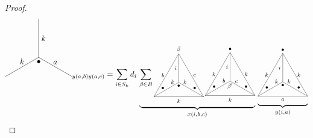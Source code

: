 \documentclass{amsart}
\begin{document}
\begin{proof}
\begin{equation}
{{{{\begin{tikzpicture}[scale=1.5]
\draw (0,0) -- (.5,.2885) node [above] {$k$}; \draw (.5,.2885) -- (1,0.577);
\draw (1,0.577) node [below] {$\bullet$} -- (1,1.1545) node [right] {$k$}; \draw (1,1.1545) -- (1,1.732);
\draw (1,0.577) -- (1.5,.2885) node [above] {$a$}; \draw (1.5,.2885) -- (2,0);
\end{tikzpicture}}}}}_{y(a,b)y(a,c)}
=\sum_{i\in S_k}d_i\,\underbrace{\sum_{\beta\in B}\vcenter{\hbox{\scalebox{.75}{\begin{tikzpicture}[scale=1.5]
\draw (0,0)  -- (1,0) node [below] {$k$}; \draw (1,0) -- (2,0);
\draw (2,0) -- (1.5,.866) node [right] {$c$}; \draw (1.5,.866) -- (1,1.732);
\draw (1,1.732) node [above] {$\beta$} -- (.5,.866) node [left] {$b$}; \draw (.5,.866) -- (0,0);
\draw (0,0) -- (.75,.433) node [above] {$k$}; \draw (.75,.433) -- (1,0.577);
\draw (1,0.577) node [below] {$\bullet$} -- (1,1.1545) node [left] {$i$}; \draw (1,1.1545) -- (1,1.732);
\draw (1,0.577) -- (1.25,.433) node [above] {$k$}; \draw (1.25,.433) -- (2,0);
\node at (.36,.35) {$\bullet$};
\node at (2-.36,.35) {$\bullet$};
\end{tikzpicture}}}}\,\vcenter{\hbox{\scalebox{.75}{\begin{tikzpicture}[scale=1.5]
\draw (0,0) -- (1,0) node [below] {$k$}; \draw (1,0) -- (2,0);
\draw (2,0) -- (1.5,.866) node [right] {$k$}; \draw (1.5,.866) -- (1,1.732);
\draw (1,1.732) node [above] {$\bullet$} -- (.5,.866) node [left] {$k$}; \draw (.5,.866) -- (0,0);
\draw (0,0) -- (.75,.433) node [above] {$b$}; \draw (.75,.433) -- (1,0.577);
\draw (1,0.577) node [below] {$\beta'$} -- (1,1.1545) node [left] {$i$}; \draw (1,1.1545) -- (1,1.732);
\draw (1,0.577) -- (1.25,.433) node [above] {$c$}; \draw (1.25,.433) -- (2,0);
\node at (.36,.35) {$\bullet$};
\node at (2-.36,.35) {$\bullet$};
\end{tikzpicture}}}}}_{x(i,b,c)}\,\underbrace{\vcenter{\hbox{\scalebox{.75}{\begin{tikzpicture}[scale=1.5]
\draw (0,0) -- (1,0) node [below] {$a$}; \draw (1,0) -- (2,0);
\draw (2,0) -- (1.5,.866) node [right] {$k$}; \draw (1.5,.866) -- (1,1.732);
\draw (1,1.732) node [above] {$\bullet$} -- (.5,.866) node [left] {$k$}; \draw (.5,.866) -- (0,0);
\draw (0,0) -- (.75,.433) node [above] {$k$}; \draw (.75,.433) -- (1,0.577);
\draw (1,0.577) node [below] {$\bullet$} -- (1,1.1545) node [left] {$i$}; \draw (1,1.1545) -- (1,1.732);
\draw (1,0.577) -- (1.25,.433) node [above] {$k$}; \draw (1.25,.433) -- (2,0);
\node at (.36,.35) {$\bullet$};
\node at (2-.36,.35) {$\bullet$};
\end{tikzpicture}}}}}_{y(i,a)}
\end{equation}


\end{proof}
\end{document}
